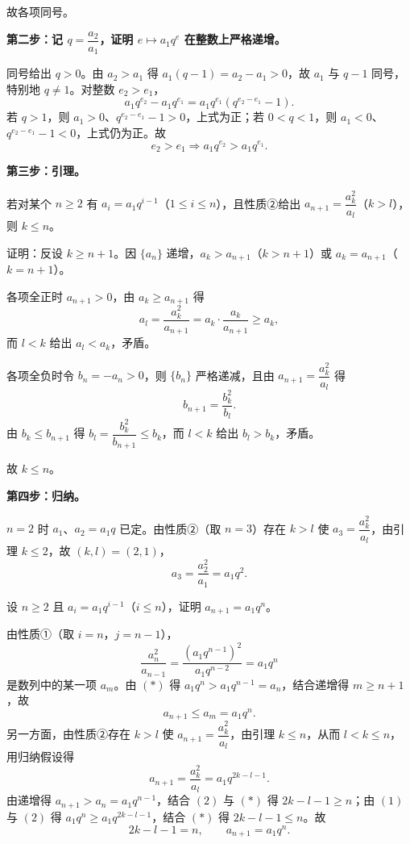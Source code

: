\begin{answer}
故各项同号。

\textbf{第二步：记 $q=\dfrac{a_2}{a_1}$，证明 $e\mapsto a_1q^e$ 在整数上严格递增。}

同号给出 $q>0$。由 $a_2>a_1$ 得 $a_1(q-1)=a_2-a_1>0$，故 $a_1$ 与 $q-1$ 同号，特别地 $q\neq1$。对整数 $e_2>e_1$，
\nopagebreak[4]
\[a_1q^{e_2}-a_1q^{e_1}=a_1q^{e_1}\left(q^{e_2-e_1}-1\right).\]
若 $q>1$，则 $a_1>0$、$q^{e_2-e_1}-1>0$，上式为正；若 $0<q<1$，则 $a_1<0$、$q^{e_2-e_1}-1<0$，上式仍为正。故
\nopagebreak[4]
\[e_2>e_1\Longrightarrow a_1q^{e_2}>a_1q^{e_1}. \tag{$*$}\]

\textbf{第三步：引理。}

若对某个 $n\geqslant2$ 有 $a_i=a_1q^{i-1}$（$1\leqslant i\leqslant n$），且性质②给出 $a_{n+1}=\dfrac{a_k^2}{a_l}$（$k>l$），则 $k\leqslant n$。

证明：反设 $k\geqslant n+1$。因 $\{a_n\}$ 递增，$a_k>a_{n+1}$（$k>n+1$）或 $a_k=a_{n+1}$（$k=n+1$）。

各项全正时 $a_{n+1}>0$，由 $a_k\geqslant a_{n+1}$ 得
\nopagebreak[4]
\[a_l=\frac{a_k^2}{a_{n+1}}=a_k\cdot\frac{a_k}{a_{n+1}}\geqslant a_k,\]
而 $l<k$ 给出 $a_l<a_k$，矛盾。

各项全负时令 $b_n=-a_n>0$，则 $\{b_n\}$ 严格递减，且由 $a_{n+1}=\dfrac{a_k^2}{a_l}$ 得
\nopagebreak[4]
\[b_{n+1}=\frac{b_k^2}{b_l}.\]
由 $b_k\leqslant b_{n+1}$ 得 $b_l=\dfrac{b_k^2}{b_{n+1}}\leqslant b_k$，而 $l<k$ 给出 $b_l>b_k$，矛盾。

故 $k\leqslant n$。

\textbf{第四步：归纳。}

$n=2$ 时 $a_1$、$a_2=a_1q$ 已定。由性质②（取 $n=3$）存在 $k>l$ 使 $a_3=\dfrac{a_k^2}{a_l}$，由引理 $k\leqslant2$，故 $(k,l)=(2,1)$，
\nopagebreak[4]
\[a_3=\frac{a_2^2}{a_1}=a_1q^2 .\]

设 $n\geqslant2$ 且 $a_i=a_1q^{i-1}$（$i\leqslant n$），证明 $a_{n+1}=a_1q^n$。

由性质①（取 $i=n$，$j=n-1$），
\nopagebreak[4]
\[\frac{a_n^2}{a_{n-1}}=\frac{\left(a_1q^{n-1}\right)^2}{a_1q^{n-2}}=a_1q^n\]
是数列中的某一项 $a_m$。由 $(*)$ 得 $a_1q^n>a_1q^{n-1}=a_n$，结合递增得 $m\geqslant n+1$，故
\nopagebreak[4]
\[a_{n+1}\leqslant a_m=a_1q^n . \tag{1}\]
另一方面，由性质②存在 $k>l$ 使 $a_{n+1}=\dfrac{a_k^2}{a_l}$，由引理 $k\leqslant n$，从而 $l<k\leqslant n$，用归纳假设得
\nopagebreak[4]
\[a_{n+1}=\frac{a_k^2}{a_l}=a_1q^{2k-l-1}. \tag{2}\]
由递增得 $a_{n+1}>a_n=a_1q^{n-1}$，结合 $(2)$ 与 $(*)$ 得 $2k-l-1\geqslant n$；由 $(1)$ 与 $(2)$ 得 $a_1q^n\geqslant a_1q^{2k-l-1}$，结合 $(*)$ 得 $2k-l-1\leqslant n$。故
\nopagebreak[4]
\[2k-l-1=n,\qquad a_{n+1}=a_1q^n .\]


\end{answer}
